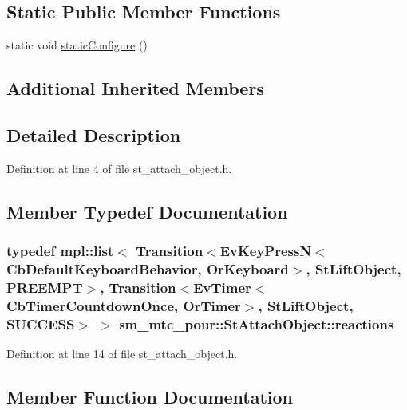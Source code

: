 \subsection*{Static Public Member Functions}
\begin{DoxyCompactItemize}
\item 
static void \hyperlink{structsm__mtc__pour_1_1StAttachObject_ad72e1b4ddf2cda58a09687c48dde49b4}{static\+Configure} ()
\end{DoxyCompactItemize}
\subsection*{Additional Inherited Members}


\subsection{Detailed Description}


Definition at line 4 of file st\+\_\+attach\+\_\+object.\+h.



\subsection{Member Typedef Documentation}
\subsubsection[{\texorpdfstring{reactions}{reactions}}]{\setlength{\rightskip}{0pt plus 5cm}typedef mpl\+::list$<$ Transition$<$Ev\+Key\+PressN$<$Cb\+Default\+Keyboard\+Behavior, {\bf Or\+Keyboard}$>$, {\bf St\+Lift\+Object}, {\bf P\+R\+E\+E\+M\+PT}$>$, Transition$<$Ev\+Timer$<$Cb\+Timer\+Countdown\+Once, {\bf Or\+Timer}$>$, {\bf St\+Lift\+Object}, {\bf S\+U\+C\+C\+E\+SS}$>$ $>$ {\bf sm\+\_\+mtc\+\_\+pour\+::\+St\+Attach\+Object\+::reactions}}\hypertarget{structsm__mtc__pour_1_1StAttachObject_a8fdbbbf0d35e1a54294081cd02b8faf1}{}\label{structsm__mtc__pour_1_1StAttachObject_a8fdbbbf0d35e1a54294081cd02b8faf1}


Definition at line 14 of file st\+\_\+attach\+\_\+object.\+h.



\subsection{Member Function Documentation}
